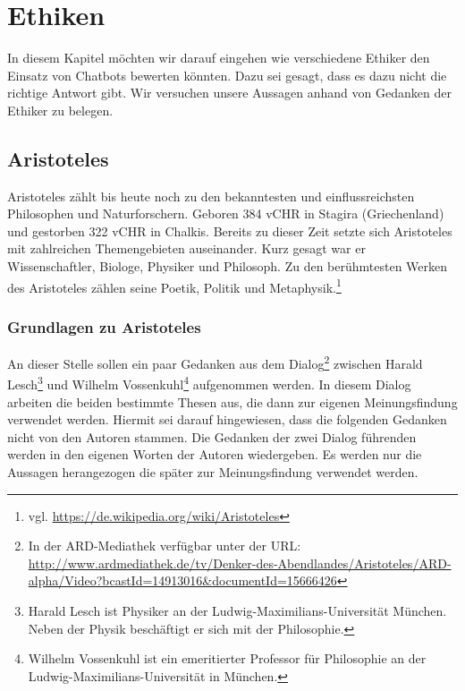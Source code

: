 \section{Ethiken}
In diesem Kapitel möchten wir darauf eingehen wie verschiedene Ethiker den Einsatz von Chatbots bewerten könnten. Dazu sei gesagt, dass es dazu nicht die richtige Antwort gibt. Wir versuchen unsere Aussagen anhand von Gedanken der Ethiker zu belegen. 

\subsection{Aristoteles}
Aristoteles zählt bis heute noch zu den bekanntesten und einflussreichsten Philosophen und Naturforschern. Geboren 384 \ac{vCHR} in Stagira (Griechenland) und gestorben 322 \ac{vCHR} in Chalkis. Bereits zu dieser Zeit setzte sich Aristoteles mit zahlreichen Themengebieten auseinander. Kurz gesagt war er Wissenschaftler, Biologe, Physiker und Philosoph. Zu den berühmtesten Werken des Aristoteles zählen seine Poetik, Politik und Metaphysik.\footnote{vgl. \url{https://de.wikipedia.org/wiki/Aristoteles}}


\subsubsection{Grundlagen zu Aristoteles}

An dieser Stelle sollen ein paar Gedanken aus dem Dialog\footnote{In der ARD-Mediathek verfügbar unter der URL: \url{http://www.ardmediathek.de/tv/Denker-des-Abendlandes/Aristoteles/ARD-alpha/Video?bcastId=14913016&documentId=15666426}} zwischen Harald Lesch\footnote{Harald Lesch ist Physiker an der Ludwig-Maximilians-Universität München. Neben der Physik beschäftigt er sich mit der Philosophie.} und Wilhelm Vossenkuhl\footnote{Wilhelm Vossenkuhl ist ein emeritierter Professor für Philosophie an der Ludwig-Maximilians-Universität in München.} aufgenommen werden. In diesem Dialog arbeiten die beiden bestimmte Thesen aus, die dann zur eigenen Meinungsfindung verwendet werden. Hiermit sei darauf hingewiesen, dass die folgenden Gedanken nicht von den Autoren stammen. Die Gedanken der zwei Dialog führenden werden in den eigenen Worten der Autoren wiedergeben. Es werden nur die Aussagen herangezogen die später zur Meinungsfindung verwendet werden.

